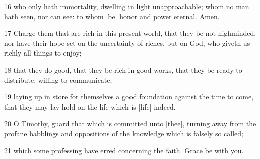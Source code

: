 \par 16 who only hath immortality, dwelling in light unapproachable; whom no man hath seen, nor can see: to whom [be] honor and power eternal. Amen.
\par 17 Charge them that are rich in this present world, that they be not highminded, nor have their hope set on the uncertainty of riches, but on God, who giveth us richly all things to enjoy;
\par 18 that they do good, that they be rich in good works, that they be ready to distribute, willing to communicate;
\par 19 laying up in store for themselves a good foundation against the time to come, that they may lay hold on the life which is [life] indeed.
\par 20 O Timothy, guard that which is committed unto [thee], turning away from the profane babblings and oppositions of the knowledge which is falsely so called;
\par 21 which some professing have erred concerning the faith. Grace be with you.

